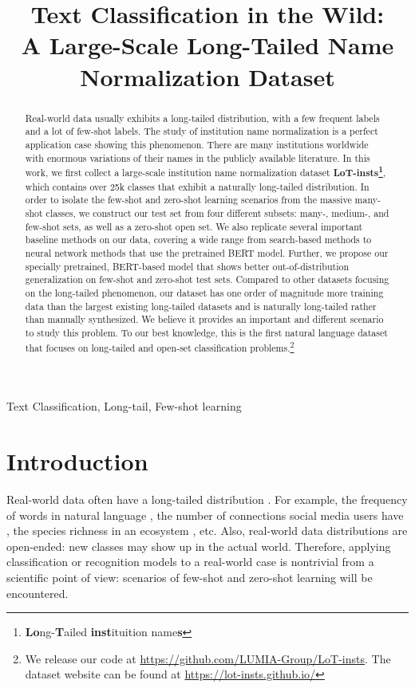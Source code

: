 \documentclass{article}
\title{Text Classification in the Wild: \\A Large-Scale Long-Tailed Name Normalization Dataset}
\begin{document}
\maketitle
\begin{abstract}
Real-world data usually exhibits a long-tailed distribution, with a few frequent labels and a lot of few-shot labels. The study of institution name normalization is a perfect application case showing this phenomenon. There are many institutions worldwide with enormous variations of their names in the publicly available literature. 
In this work, we first collect a large-scale institution name normalization dataset \textbf{LoT-insts\footnote{\textbf{Lo}ng-\textbf{T}ailed \textbf{inst}ituition name\textbf{s}}}, which contains over 25k classes that exhibit a naturally long-tailed distribution. In order to isolate the few-shot and zero-shot learning scenarios from the massive many-shot classes, we construct our test set from four different subsets: many-, medium-, and few-shot sets, as well as a zero-shot open set. 
We also replicate several important baseline methods on our data, covering a wide range from search-based methods to neural network methods that use the pretrained BERT model.
Further, we propose our specially pretrained, BERT-based model that shows better out-of-distribution generalization on few-shot and zero-shot test sets. 
Compared to other datasets focusing on the long-tailed phenomenon, our dataset has one order of magnitude more training data than the largest existing long-tailed datasets and is naturally long-tailed rather than manually synthesized. We believe it provides an important and different scenario to study this problem. 
To our best knowledge, this is the first natural language dataset that focuses on long-tailed and open-set classification problems.\footnote{We release our code at \url{https://github.com/LUMIA-Group/LoT-insts}. The dataset website can be found at \url{https://lot-insts.github.io/}}
\end{abstract}

\begin{keywords}
Text Classification, Long-tail, Few-shot learning
\end{keywords}


\section{Introduction}
Real-world data often have a long-tailed distribution \cite{liu2019large}. For example, the frequency of words in natural language \cite{newman2005power}, the number of connections social media users have \cite{weller2016trying}, the species richness in an ecosystem \cite{albert2011historical}, etc. Also, real-world data distributions are open-ended: new classes may show up in the actual world. Therefore, applying classification or recognition models to a real-world case is nontrivial from a scientific point of view: scenarios of few-shot and zero-shot learning will be encountered.
\end{document}
